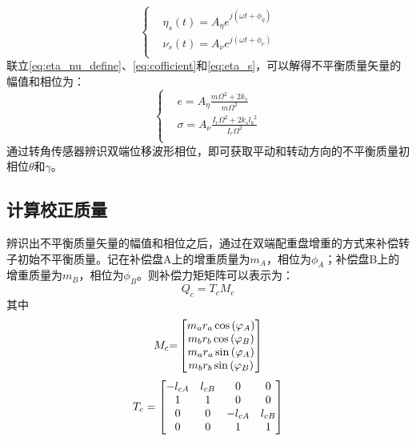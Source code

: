 \begin{equation}
\label{eq:eta_s}
\left\{
\begin{aligned}
& \eta _s (t) = A_{\eta}e^{j(\omega t + \phi _{\eta})} \\
& \nu _s (t) = A_{\nu}e^{j(\omega t + \phi _{\nu})} \\
\end{aligned}
\right.
\end{equation}
联立\autoref{eq:eta_nu_define}、\autoref{eq:cofficient}和\autoref{eq:eta_s}，可以解得不平衡质量矢量的幅值和相位为：
\begin{equation}
\left\{
\begin{aligned}
& e = A_{\eta}\frac{m{\Omega}^2 + 2k_s}{m{\Omega}^2}\\
& \sigma = A_{\nu}\frac{I_r{\Omega}^2 + 2k_s{l_b}^2}{I_r{\Omega}^2}\\
\end{aligned}
\right.
\end{equation}
通过转角传感器辨识双端位移波形相位，即可获取平动和转动方向的不平衡质量初相位$\theta$和$\gamma$。
\subsection{计算校正质量}
辨识出不平衡质量矢量的幅值和相位之后，通过在双端配重盘增重的方式来补偿转子初始不平衡质量。记在补偿盘A上的增重质量为$m_A$，相位为$\phi _A$；补偿盘B上的增重质量为$m_B$，相位为$\phi _B$。则补偿力矩矩阵可以表示为：
\begin{equation}
Q_c = T_cM_c
\end{equation}
其中
\begin{equation}
{M_c}{\rm{ = }}\left[ {\begin{matrix}
   {{m_a}{r_a}\cos \left( {{\varphi _A}} \right)}  \cr 
   {{m_b}{r_b}\cos \left( {{\varphi _B}} \right)}  \cr 
   {{m_a}{r_a}\sin \left( {{\varphi _A}} \right)}  \cr 
   {{m_b}{r_b}\sin \left( {{\varphi _B}} \right)}  \cr 

 \end{matrix} } \right]
\end{equation}
\begin{equation}
{T_c} = \left[ {\begin{matrix}
   { - {l_{cA}}} & {{l_{cB}}} & 0 & 0  \cr 
   1 & 1 & 0 & 0  \cr 
   0 & 0 & { - {l_{cA}}} & {{l_{cB}}}  \cr 
   0 & 0 & 1 & 1  \cr 

 \end{matrix} } \right]
\end{equation}

